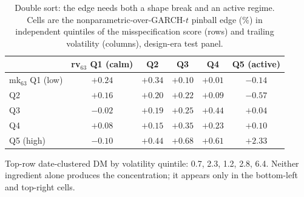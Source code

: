 \documentclass[11pt]{article}
\theoremstyle{remark}
\begin{document}
\begin{table}[tp]
\centering
\begin{threeparttable}
\caption{Double sort: the edge needs both a shape break and an active
regime. Cells are the nonparametric-over-GARCH-$t$ pinball edge (\%)
in independent quintiles of the misspecification score (rows) and
trailing volatility (columns), design-era test panel.}
\label{tab:doublesort}
\footnotesize\setlength{\tabcolsep}{5pt}
\begin{tabular}{lccccc}
\toprule
 & rv$_{63}$ Q1 (calm) & Q2 & Q3 & Q4 & Q5 (active) \\
\midrule
mk$_{63}$ Q1 (low) & $+0.24$ & $+0.34$ & $+0.10$ & $+0.01$ & $-0.14$ \\
Q2 & $+0.16$ & $+0.20$ & $+0.22$ & $+0.09$ & $-0.57$ \\
Q3 & $-0.02$ & $+0.19$ & $+0.25$ & $+0.44$ & $+0.04$ \\
Q4 & $+0.08$ & $+0.15$ & $+0.35$ & $+0.23$ & $+0.10$ \\
Q5 (high) & $-0.10$ & $+0.44$ & $+0.68$ & $+0.61$ & $\mathbf{+2.33}$ \\
\bottomrule
\end{tabular}
\begin{tablenotes}\footnotesize
\item Top-row date-clustered DM by volatility quintile: 0.7, 2.3, 1.2,
2.8, 6.4. Neither ingredient alone produces the concentration; it
appears only in the bottom-left and top-right cells.
\end{tablenotes}
\end{threeparttable}
\end{table}
\end{document}
